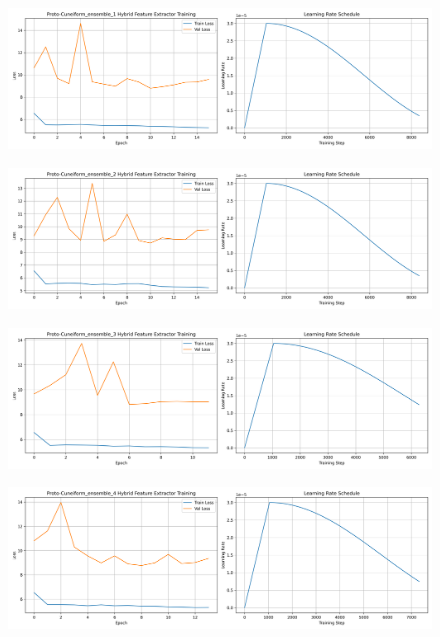 \documentclass[11pt,a4paper,oneside]{report}
\begin{document}
\begin{figure}[H]
    \centering
    \includegraphics[width=1\linewidth]{Visualizations/Training/Proto-Cuneiform/Proto-Cuneiform_ensemble_1_hybrid_extractor_history.png}
\end{figure}
\begin{figure}[H]
    \centering
    \includegraphics[width=1\linewidth]{Visualizations/Training/Proto-Cuneiform/Proto-Cuneiform_ensemble_2_hybrid_extractor_history.png}
\end{figure}
\begin{figure}[H]
    \centering
    \includegraphics[width=1\linewidth]{Visualizations/Training/Proto-Cuneiform/Proto-Cuneiform_ensemble_3_hybrid_extractor_history.png}
\end{figure}
\begin{figure}[H]
    \centering
    \includegraphics[width=1\linewidth]{Visualizations/Training/Proto-Cuneiform/Proto-Cuneiform_ensemble_4_hybrid_extractor_history.png}
\end{figure}
\end{document}
